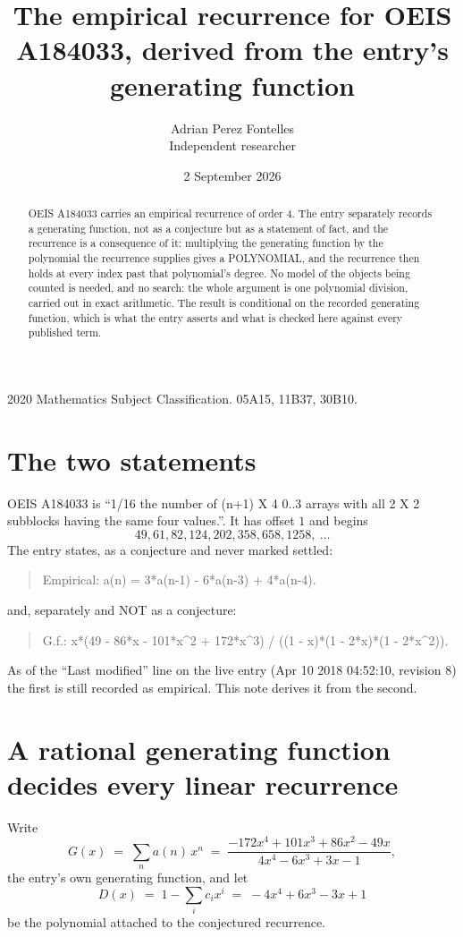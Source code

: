 \documentclass[11pt,a4paper]{article}
\title{The empirical recurrence for OEIS A184033, derived from the entry's generating function}
\author{Adrian Perez Fontelles\\ \small Independent researcher}
\date{2 September 2026}
\theoremstyle{plain}
\theoremstyle{definition}
\begin{document}
\maketitle

\begin{abstract}
OEIS A184033 carries an empirical recurrence of order $4$. The entry separately records a
generating function, not as a conjecture but as a statement of fact, and the recurrence is a
consequence of it: multiplying the generating function by the polynomial the recurrence
supplies gives a POLYNOMIAL, and the recurrence then holds at every index past that
polynomial's degree. No model of the objects being counted is needed, and no search: the
whole argument is one polynomial division, carried out in exact arithmetic. The result is
conditional on the recorded generating function, which is what the entry asserts and what is
checked here against every published term.
\end{abstract}

\noindent\small 2020 Mathematics Subject Classification. 05A15, 11B37, 30B10.\normalsize

\section{The two statements}

OEIS A184033 is ``1/16 the number of (n+1) X 4 0..3 arrays with all 2 X 2 subblocks having the same four values.''. It has offset $1$ and begins
\[
49, 61, 82, 124, 202, 358, 658, 1258,\ \dots
\]
The entry states, as a conjecture and never marked settled:
\begin{quote}
Empirical: a(n) = 3*a(n-1) - 6*a(n-3) + 4*a(n-4).
\end{quote}
and, separately and NOT as a conjecture:
\begin{quote}
G.f.: x*(49 - 86*x - 101*x\^{}2 + 172*x\^{}3) / ((1 - x)*(1 - 2*x)*(1 - 2*x\^{}2)).
\end{quote}
As of the ``Last modified'' line on the live entry (Apr 10 2018 04:52:10, revision 8) the first is still
recorded as empirical. This note derives it from the second.

\section{A rational generating function decides every linear recurrence}

Write
\[
G(x)\;=\;\sum_{n}a(n)\,x^{n}\;=\;\frac{- 172 x^{4} + 101 x^{3} + 86 x^{2} - 49 x}{4 x^{4} - 6 x^{3} + 3 x - 1},
\]
the entry's own generating function, and let
\[
D(x)\;=\;1-\sum_i c_i x^{i}\;=\;- 4 x^{4} + 6 x^{3} - 3 x + 1
\]
be the polynomial attached to the conjectured recurrence.
\end{document}
